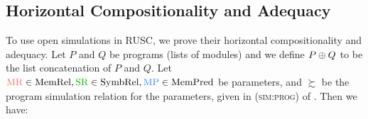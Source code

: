 {%



}

\subsection{Horizontal Compositionality and Adequacy}
\label{sec:main-verification:theorems}

To use open simulations in RUSC, we prove their horizontal compositionality and adequacy.  Let $P$
and $Q$ be programs (\ie lists of modules) and we define $P \oplus Q$ to be the list concatenation
of $P$ and $Q$.  Let
$\MREL \in \textrm{MemRel}, \SREL \in \textrm{SymbRel}, \MPRED \in \textrm{MemPred}$ be parameters,
and $\succsim$ be the program simulation relation for the parameters,
given in \textsc{(sim:prog)} of .  Then we have:

